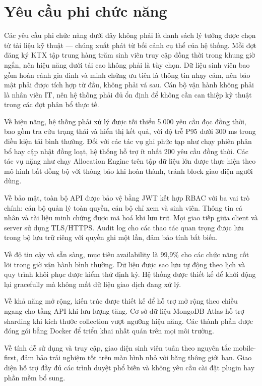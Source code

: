 \documentclass[../DoAn.tex]{subfiles}
\begin{document}
\section{Yêu cầu phi chức năng}
\label{sec:nonfunctional}

Các yêu cầu phi chức năng dưới đây không phải là danh sách lý tưởng được chọn
từ tài liệu kỹ thuật --- chúng xuất phát từ bối cảnh cụ thể của hệ thống. Mỗi
đợt đăng ký KTX tập trung hàng trăm sinh viên truy cập đồng thời trong khung
giờ ngắn, nên hiệu năng dưới tải cao không phải là tùy chọn. Dữ liệu sinh viên
bao gồm hoàn cảnh gia đình và minh chứng ưu tiên là thông tin nhạy cảm, nên bảo
mật phải được tích hợp từ đầu, không phải vá sau. Cán bộ vận hành không phải
là nhân viên IT, nên hệ thống phải đủ ổn định để không cần can thiệp kỹ thuật
trong các đợt phân bổ thực tế.

Về hiệu năng, hệ thống phải xử lý được tối thiểu 5.000 yêu cầu đọc đồng thời,
bao gồm tra cứu trạng thái và hiển thị kết quả, với độ trễ P95 dưới 300 ms
trong điều kiện tải bình thường. Đối với các tác vụ ghi phức tạp như chạy phiên
phân bổ hay cập nhật đồng loạt, hệ thống hỗ trợ ít nhất 200 yêu cầu đồng thời.
Các tác vụ nặng như chạy Allocation Engine trên tập dữ liệu lớn được thực hiện
theo mô hình bất đồng bộ với thông báo khi hoàn thành, tránh block giao diện
người dùng.

Về bảo mật, toàn bộ API được bảo vệ bằng JWT kết hợp RBAC với ba vai trò chính:
cán bộ quản lý toàn quyền, cán bộ chỉ xem và sinh viên. Thông tin cá nhân và
tài liệu minh chứng được mã hoá khi lưu trữ. Mọi giao tiếp giữa client và
server sử dụng TLS/HTTPS. Audit log cho các thao tác quan trọng được lưu trong
bộ lưu trữ riêng với quyền ghi một lần, đảm bảo tính bất biến.

Về độ tin cậy và sẵn sàng, mục tiêu availability là 99,9\% cho các chức năng
cốt lõi trong giờ vận hành bình thường. Dữ liệu được sao lưu tự động theo lịch
và quy trình khôi phục được kiểm thử định kỳ. Hệ thống được thiết kế để khởi
động lại gracefully mà không mất dữ liệu giao dịch đang xử lý.

Về khả năng mở rộng, kiến trúc được thiết kế để hỗ trợ mở rộng theo chiều ngang
cho tầng API khi lưu lượng tăng. Cơ sở dữ liệu MongoDB Atlas hỗ trợ sharding
khi kích thước collection vượt ngưỡng hiệu năng. Các thành phần được đóng gói
bằng Docker để triển khai nhất quán trên mọi môi trường.

Về tính dễ sử dụng và truy cập, giao diện sinh viên tuân theo nguyên tắc
mobile-first, đảm bảo trải nghiệm tốt trên màn hình nhỏ với băng thông giới
hạn. Giao diện hỗ trợ đầy đủ các trình duyệt phổ biến và không yêu cầu cài đặt
plugin hay phần mềm bổ sung.
\end{document}
